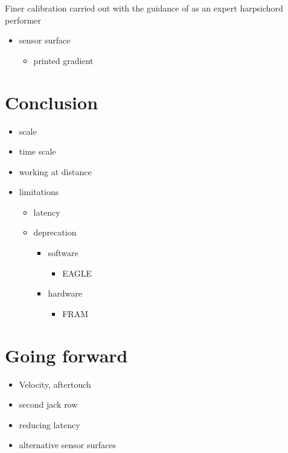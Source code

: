 Finer calibration carried out with the guidance of  as
an expert harpsichord performer

\begin{itemize}
\item
  sensor surface

  \begin{itemize}
  \item
    printed gradient
  \end{itemize}
\end{itemize}

\section{Conclusion}\label{conclusion}

\begin{itemize}
\item
  scale
\item
  time scale
\item
  working at distance
\item
  limitations

  \begin{itemize}
  \item
    latency
  \item
    deprecation

    \begin{itemize}
    \item
      software

      \begin{itemize}
      \item
        EAGLE
      \end{itemize}
    \item
      hardware

      \begin{itemize}
      \item
        FRAM
      \end{itemize}
    \end{itemize}
  \end{itemize}
\end{itemize}

\section{Going forward}\label{going-forward}

\begin{itemize}
\item
  Velocity, aftertouch
\item
  second jack row
\item
  reducing latency
\item
  alternative sensor surfaces
\end{itemize}

